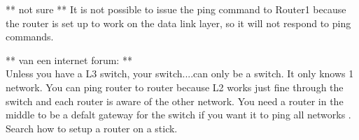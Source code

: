 ** not sure **
It is not possible to issue the ping command to Router1 because the router is set up
to work on the data link layer, so it will not respond to ping commands.

** van een internet forum: **\\
Unless you have a L3 switch, your switch....can only be a switch. It only knows 1 network.
You can ping router to router because L2 works just fine through the switch and each
router is aware of the other network. You need a router in the middle to be a defalt
gateway for the switch if you want it to ping all networks . Search how to setup a router on a stick.
